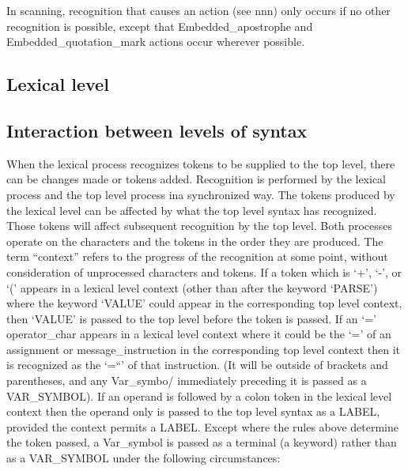 In scanning, recognition that causes an action (see nnn) only occurs if
no other recognition is possible, except that Embedded\_apostrophe and
Embedded\_quotation\_mark actions occur wherever possible.

\hypertarget{lexical-level}{%
\subsection{Lexical level}\label{lexical-level}}

\hypertarget{interaction-between-levels-of-syntax}{%
\subsection{Interaction between levels of
syntax}\label{interaction-between-levels-of-syntax}}

When the lexical process recognizes tokens to be supplied to the top
level, there can be changes made or tokens added. Recognition is
performed by the lexical process and the top level process ina
synchronized way. The tokens produced by the lexical level can be
affected by what the top level syntax has recognized. Those tokens will
affect subsequent recognition by the top level. Both processes operate
on the characters and the tokens in the order they are produced. The
term ``context'' refers to the progress of the recognition at some
point, without consideration of unprocessed characters and tokens. If a
token which is `+', `-', \textquotesingle{} or `(' appears in a lexical
level context (other than after the keyword `PARSE') where the keyword
`VALUE' could appear in the corresponding top level context, then
`VALUE' is passed to the top level before the token is passed. If an `='
operator\_char appears in a lexical level context where it could be the
`=' of an assignment or message\_instruction in the corresponding top
level context then it is recognized as the `=``' of that instruction.
(It will be outside of brackets and parentheses, and any Var\_symbo/
immediately preceding it is passed as a VAR\_SYMBOL). If an operand is
followed by a colon token in the lexical level context then the operand
only is passed to the top level syntax as a LABEL, provided the context
permits a LABEL. Except where the rules above determine the token
passed, a Var\_symbol is passed as a terminal (a keyword) rather than as
a VAR\_SYMBOL under the following circumstances:

